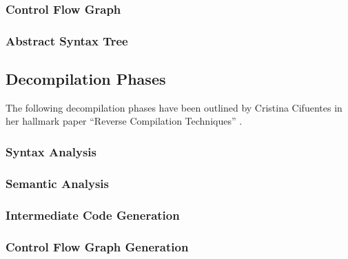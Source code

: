 \documentclass[12pt, a4paper]{article}
\begin{document}
\subsubsection{Control Flow Graph}


\subsubsection{Abstract Syntax Tree}


\subsection{Decompilation Phases}


The following decompilation phases have been outlined by Cristina Cifuentes in
her hallmark paper ``Reverse Compilation Techniques'' \cite{rev_comp}.


\subsubsection{Syntax Analysis}


\subsubsection{Semantic Analysis}


\subsubsection{Intermediate Code Generation}


\subsubsection{Control Flow Graph Generation}
\end{document}
